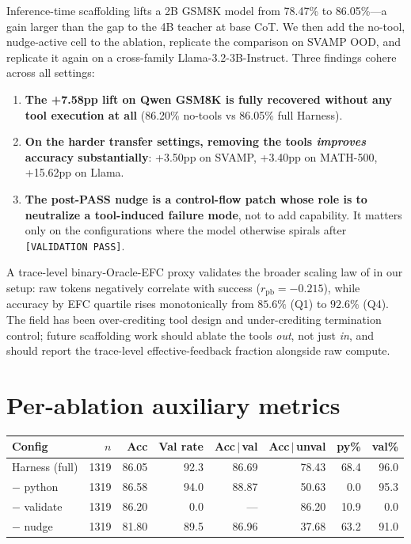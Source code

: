 \documentclass[10pt]{article}
\begin{document}
Inference-time scaffolding lifts a 2B GSM8K model from 78.47\% to 86.05\%---a gain larger than the gap to the 4B teacher at base CoT. We then add the no-tool, nudge-active cell to the ablation, replicate the comparison on SVAMP OOD, and replicate it again on a cross-family Llama-3.2-3B-Instruct. Three findings cohere across all settings:
\begin{enumerate}
  \item \textbf{The +7.58pp lift on Qwen GSM8K is fully recovered without any tool execution at all} (86.20\% no-tools vs 86.05\% full Harness).
  \item \textbf{On the harder transfer settings, removing the tools \emph{improves} accuracy substantially}: +3.50pp on SVAMP, +3.40pp on MATH-500, +15.62pp on Llama.
  \item \textbf{The post-PASS nudge is a control-flow patch whose role is to neutralize a tool-induced failure mode}, not to add capability. It matters only on the configurations where the model otherwise spirals after \texttt{[VALIDATION PASS]}.
\end{enumerate}
A trace-level binary-Oracle-EFC proxy validates the broader scaling law of \citet{efc2026} in our setup: raw tokens negatively correlate with success ($r_\text{pb}{=}{-}0.215$), while accuracy by EFC quartile rises monotonically from $85.6\%$ (Q1) to $92.6\%$ (Q4). The field has been over-crediting tool design and under-crediting termination control; future scaffolding work should ablate the tools \emph{out}, not just \emph{in}, and should report the trace-level effective-feedback fraction alongside raw compute.




\appendix

\section{Per-ablation auxiliary metrics}

\begin{table}[h]
\centering
\small
\begin{tabular}{lrrrrrrr}
\toprule
Config & $n$ & Acc & Val rate & Acc\,$|$\,val & Acc\,$|$\,unval & py\% & val\% \\
\midrule
Harness (full) & 1319 & 86.05 & 92.3 & 86.69 & 78.43 & 68.4 & 96.0 \\
$-$ python    & 1319 & 86.58 & 94.0 & 88.87 & 50.63 & 0.0  & 95.3 \\
$-$ validate  & 1319 & 86.20 & 0.0  & ---   & 86.20 & 10.9 & 0.0  \\
$-$ nudge     & 1319 & 81.80 & 89.5 & 86.96 & 37.68 & 63.2 & 91.0 \\
\bottomrule
\end{tabular}
\end{table}
\end{document}
